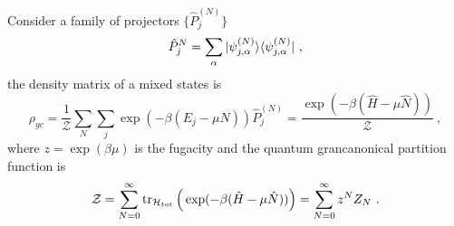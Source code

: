     Consider a family of projectors $\{\hat P_j^{(N)}\}$
    \begin{equation*}
        \hat P_j^{N} = \sum_\alpha \vert\psi_{j, \alpha}^{(N)}\rangle \langle\psi_{j, \alpha}^{(N)}\vert ~,
    \end{equation*}  
    the density matrix of a mixed states is 
    \begin{equation*}
        \rho_{gc} = \frac{1}{\mathcal Z} \sum_N \sum_j \exp(- \beta (E_j - \mu N)) \hat P_j^{(N)} = \frac{\exp(- \beta (\hat H - \mu \hat N))}{\mathcal Z} ~,
    \end{equation*}
    where $z = \exp(\beta \mu)$ is the fugacity and the quantum grancanonical partition function is 
    \begin{equation*}
        \mathcal Z = \sum_{N=0}^{\infty} \operatorname{tr}_{\mathcal H_{tot}} \Big ( \exp(- \beta (\hat H - \mu \hat N)) \Big) = \sum_{N=0}^\infty z^N Z_N ~.
    \end{equation*}
